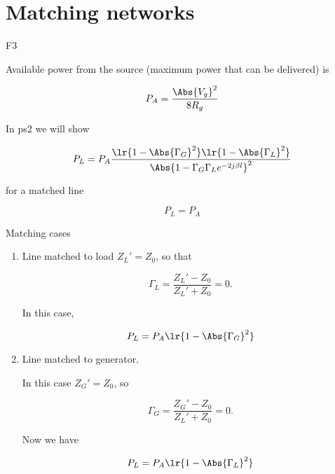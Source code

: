 %
%

\section{Matching networks}

F3

Available power from the source (maximum power that can be delivered) is

\begin{dmath}\label{eqn:uwavesDeck6LCmatchingCore:n}
P_A = \frac{\Abs{V_g}^2}{8 R_g}
\end{dmath}

In ps2 we will show 

\begin{dmath}\label{eqn:uwavesDeck6LCmatchingCore:n}
P_L = P_A \frac{ 
\lr{ 1 - \Abs{\Gamma_G}^2 }
\lr{ 1 - \Abs{\Gamma_L}^2 } }
{
\Abs{ 1 - \Gamma_G \Gamma_L e^{-2 j \beta l } }^2
}
\end{dmath}

for a matched line 

\begin{dmath}\label{eqn:uwavesDeck6LCmatchingCore:n}
P_L = P_A
\end{dmath}

Matching cases

\begin{enumerate}
\item Line matched to load \( Z_L' = Z_0 \), so that

\begin{dmath}\label{eqn:uwavesDeck6LCmatchingCore:n}
\Gamma_L 
= \frac{Z_L' - Z_0}{Z_L' + Z_0}
= 0.
\end{dmath}

In this case, 

\begin{dmath}\label{eqn:uwavesDeck6LCmatchingCore:n}
P_L = P_A \lr{ 1 - \Abs{\Gamma_G}^2 }
\end{dmath}

\item Line matched to generator.

In this case \( Z_G' = Z_0 \), so

\begin{dmath}\label{eqn:uwavesDeck6LCmatchingCore:n}
\Gamma_G 
= \frac{Z_G' - Z_0}{Z_L' + Z_0}
= 0.
\end{dmath}

Now we have

\begin{dmath}\label{eqn:uwavesDeck6LCmatchingCore:n}
P_L = P_A \lr{ 1 - \Abs{\Gamma_L}^2 }
\end{dmath}

\end{enumerate}

